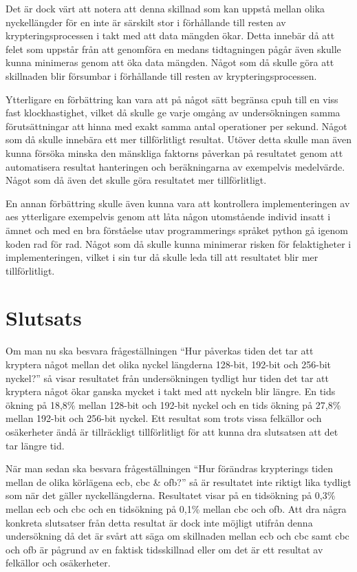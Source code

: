 Det är dock värt att notera att denna skillnad som kan uppstå mellan olika nyckellängder för en inte är särskilt stor i förhållande till resten av krypteringsprocessen
i takt med att data mängden ökar. Detta innebär då att felet som uppstår från att genomföra en medans tidtagningen pågår även skulle kunna minimeras genom att
öka data mängden. Något som då skulle göra att skillnaden blir försumbar i förhållande till resten av krypteringsprocessen.%

Ytterligare en förbättring kan vara att på något sätt begränsa \gls{cpuh} till en viss fast klockhastighet, vilket då skulle ge varje omgång av undersökningen samma förutsättningar
att hinna med exakt samma antal operationer per sekund. Något som då skulle innebära ett mer tillförlitligt resultat. Utöver detta skulle man även kunna försöka minska den mänskliga faktorns
påverkan på resultatet genom att automatisera resultat hanteringen och beräkningarna av exempelvis medelvärde. Något som då även det skulle göra resultatet mer tillförlitligt. %

En annan förbättring skulle även kunna vara att kontrollera implementeringen av \acrshort{aes} ytterligare exempelvis genom att låta någon utomstående individ insatt i ämnet och
med en bra förståelse utav programmerings språket \gls{python} gå igenom koden rad för rad. Något som då skulle kunna minimerar risken för felaktigheter i implementeringen,
vilket i sin tur då skulle leda till att resultatet blir mer tillförlitligt. %

\section{Slutsats} %
\label{sec:conclusion}
Om man nu ska besvara frågeställningen “Hur påverkas tiden det tar att kryptera något mellan det olika nyckel längderna 128-bit, 192-bit och 256-bit nyckel?” så visar resultatet från
undersökningen tydligt hur tiden det tar att kryptera något ökar ganska mycket i takt med att nyckeln blir längre. En tids ökning på 18,8\% mellan 128-bit och 192-bit nyckel och en tids ökning på 27,8\%
mellan 192-bit och 256-bit nyckel. Ett resultat som trots vissa felkällor och osäkerheter ändå är tillräckligt tillförlitligt för att kunna dra slutsatsen att det tar längre tid.

När man sedan ska besvara frågeställningen “Hur förändras krypterings tiden mellan de olika körlägena \acrshort{ecb}, \acrshort{cbc} \& \acrshort{ofb}?” så är resultatet inte
riktigt lika tydligt som när det gäller nyckellängderna. Resultatet visar på en tidsökning på 0,3\% mellan \acrshort{ecb} och \acrshort{cbc} och en tidsökning på 0,1\% mellan \acrshort{cbc} och
\acrshort{ofb}. Att dra några konkreta slutsatser från detta resultat är dock inte möjligt utifrån denna undersökning då det är svårt att säga om skillnaden mellan \acrshort{ecb} och \acrshort{cbc} samt
\acrshort{cbc} och \acrshort{ofb} är pågrund av en faktisk tidsskillnad eller om det är ett resultat av felkällor och osäkerheter.

